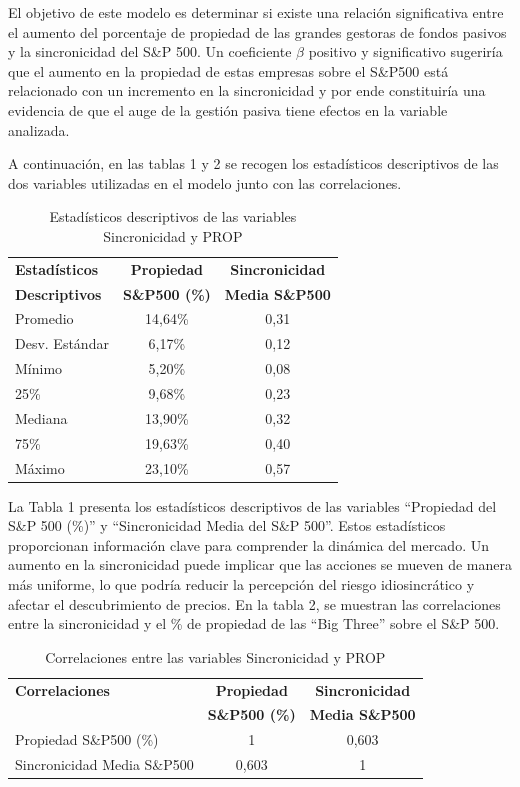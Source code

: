 \documentclass[12pt,a4paper]{article}
\begin{document}
El objetivo de este modelo es determinar si existe una relación significativa entre el aumento del porcentaje de propiedad de las grandes gestoras de fondos pasivos y la sincronicidad del S\&P 500. Un coeficiente $\beta$ positivo y significativo sugeriría que el aumento en la propiedad de estas empresas sobre el S\&P500 está relacionado con un incremento en la sincronicidad y por ende constituiría una evidencia de que el auge de la gestión pasiva tiene efectos en la variable analizada.

A continuación, en las tablas 1 y 2 se recogen los estadísticos descriptivos de las dos variables utilizadas en el modelo junto con las correlaciones.

\begin{table}[H]
\centering
\caption{Estadísticos descriptivos de las variables Sincronicidad y PROP}
\label{tab:descriptive_stats}
\small
\begin{tabular}{lcc}
\toprule
\textbf{Estadísticos} & \textbf{Propiedad} & \textbf{Sincronicidad} \\
\textbf{Descriptivos} & \textbf{S\&P500 (\%)} & \textbf{Media S\&P500} \\
\midrule
Promedio & 14,64\% & 0,31 \\
Desv. Estándar & 6,17\% & 0,12 \\
Mínimo & 5,20\% & 0,08 \\
25\% & 9,68\% & 0,23 \\
Mediana & 13,90\% & 0,32 \\
75\% & 19,63\% & 0,40 \\
Máximo & 23,10\% & 0,57 \\
\bottomrule
\end{tabular}
\end{table}

La Tabla 1 presenta los estadísticos descriptivos de las variables ``Propiedad del S\&P 500 (\%)'' y ``Sincronicidad Media del S\&P 500''. Estos estadísticos proporcionan información clave para comprender la dinámica del mercado. Un aumento en la sincronicidad puede implicar que las acciones se mueven de manera más uniforme, lo que podría reducir la percepción del riesgo idiosincrático y afectar el descubrimiento de precios. En la tabla 2, se muestran las correlaciones entre la sincronicidad y el \% de propiedad de las ``Big Three'' sobre el S\&P 500.

\begin{table}[H]
\centering
\caption{Correlaciones entre las variables Sincronicidad y PROP}
\label{tab:correlation}
\small
\begin{tabular}{lcc}
\toprule
\textbf{Correlaciones} & \textbf{Propiedad} & \textbf{Sincronicidad} \\
 & \textbf{S\&P500 (\%)} & \textbf{Media S\&P500} \\
\midrule
Propiedad S\&P500 (\%) & 1 & 0,603 \\
Sincronicidad Media S\&P500 & 0,603 & 1 \\
\bottomrule
\end{tabular}
\end{table}
\end{document}
